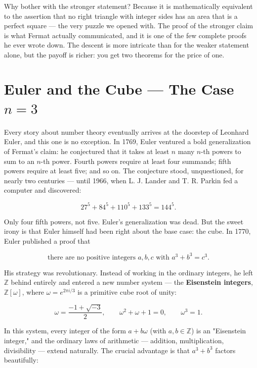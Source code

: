 \documentclass[11pt,openright,twoside]{book}
\theoremstyle{definition}
\begin{document}
Why bother with the stronger statement? Because it is mathematically equivalent to the assertion that no right triangle with integer sides has an area that is a perfect square --- the very puzzle we opened with. The proof of the stronger claim is what Fermat actually communicated, and it is one of the few complete proofs he ever wrote down. The descent is more intricate than for the weaker statement alone, but the payoff is richer: you get two theorems for the price of one.


\bigskip


\section{Euler and the Cube — The Case $n = 3$}

Every story about number theory eventually arrives at the doorstep of Leonhard Euler, and this one is no exception. In 1769, Euler ventured a bold generalization of Fermat's claim: he conjectured that it takes at least $n$ many $n$-th powers to sum to an $n$-th power. Fourth powers require at least four summands; fifth powers require at least five; and so on. The conjecture stood, unquestioned, for nearly two centuries --- until 1966, when L. J. Lander and T. R. Parkin fed a computer and discovered:

\[27^5 + 84^5 + 110^5 + 133^5 = 144^5.\]

Only four fifth powers, not five. Euler's generalization was dead. But the sweet irony is that Euler himself had been right about the base case: the cube. In 1770, Euler published a proof that

\[\text{there are no positive integers } a, b, c \text{ with } a^3 + b^3 = c^3.\]

His strategy was revolutionary. Instead of working in the ordinary integers, he left $\mathbb{Z}$ behind entirely and entered a new number system --- the \textbf{Eisenstein integers}, $\mathbb{Z}[\omega]$, where $\omega = e^{2\pi i / 3}$ is a primitive cube root of unity:

\[\omega = \frac{-1 + \sqrt{-3}}{2}, \qquad \omega^2 + \omega + 1 = 0, \qquad \omega^3 = 1.\]

In this system, every integer of the form $a + b\omega$ (with $a, b \in \mathbb{Z}$) is an "Eisenstein integer," and the ordinary laws of arithmetic --- addition, multiplication, divisibility --- extend naturally. The crucial advantage is that $a^3 + b^3$ factors beautifully:
\end{document}
